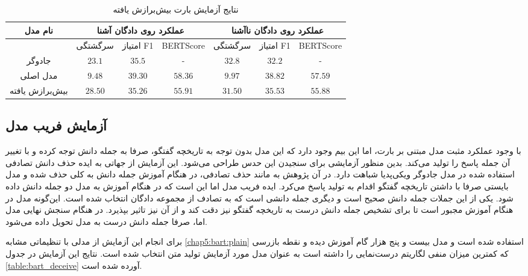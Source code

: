 \begin{table}[h]
	\caption{نتایج آزمایش بارت بیش‌برازش یافته}
	\label{table:bart_overfit}
	\begin{tabular}{|c|c|c|c|c|c|c|}
		\hline
		نام مدل         & \multicolumn{3}{c|}{عملکرد روی دادگان آشنا}           & \multicolumn{3}{c|}{عملکرد روی دادگان نا‌آشنا}        \\ \hline
		& سرگشتگی         & امتیاز F1        & BERTScore        & سرگشتگی         & امتیاز F1        & BERTScore        \\ \hline
		جادوگر          & $23.1$          & $35.5$           & -                & $32.8$          & $32.2$           & -                \\ \hline
		مدل اصلی        & $\mathbf{9.48}$ & $\mathbf{39.30}$ & $\mathbf{58.36}$ & $\mathbf{9.97}$ & $\mathbf{38.82}$ & $\mathbf{57.59}$ \\ \hline
		بیش‌برازش یافته & $28.50$         & $35.26$          & $55.91$          & $31.50$         & $35.53$          & $55.88$          \\ \hline
	\end{tabular}
\end{table}


\subsection{آزمایش فریب مدل}
با وجود عملکرد مثبت مدل مبتنی بر بارت، اما این بیم وجود دارد که این مدل بدون توجه به تاریخچه گفتگو، صرفا به جمله دانش توجه کرده و با تغییر آن جمله پاسخ را تولید می‌کند. بدین منظور آزمایشی برای سنجیدن این حدس طراحی می‌شود. این آزمایش از جهاتی به ایده حذف دانش تصادفی استفاده شده در مدل جادوگر ویکی‌پدیا شباهت دارد. در آن پژوهش به مانند حذف تصادفی، در هنگام آموزش جمله دانش به کلی حذف شده و مدل بایستی صرفا با داشتن تاریخچه گفتگو اقدام به تولید پاسخ می‌کرد. ایده فریب مدل اما این است که در هنگام آموزش به مدل دو جمله دانش داده شود. یکی از این جملات جمله دانش صحیح است و دیگری جمله دانشی است که به تصادف از مجموعه دادگان انتخاب شده است. این‌گونه مدل در هنگام آموزش مجبور است تا برای تشخیص جمله دانش درست به تاریخچه گفتگو نیز دقت کند و از آن نیز تاثیر بپذیرد. در هنگام سنجش نهایی مدل اما، صرفا جمله دانش درست به مدل تحویل داده می‌شود. 

برای انجام این آزمایش از مدلی با تنظیماتی مشابه 
\ref{chap5:bart:plain}
استفاده شده است و مدل بیست و پنج هزار گام آموزش دیده و نقطه بازرسی که کمترین میزان منفی لگاریتم درست‌نمایی را داشته است به عنوان مدل مورد آزمایش تولید متن انتخاب شده است. نتایج این آزمایش در جدول 
\ref{table:bart_deceive}
آورده شده است.

